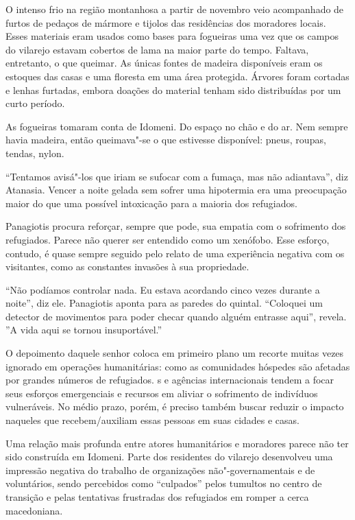 O intenso frio na região montanhosa a partir de novembro veio
acompanhado de furtos de pedaços de mármore e tijolos das residências
dos moradores locais. Esses materiais eram usados como bases para
fogueiras uma vez que os campos do vilarejo estavam cobertos de lama na
maior parte do tempo. Faltava, entretanto, o que queimar. As únicas
fontes de madeira disponíveis eram os estoques das casas e uma floresta
em uma área protegida. Árvores foram cortadas e lenhas furtadas, embora
doações do material tenham sido distribuídas por um curto período.

As fogueiras tomaram conta de Idomeni. Do espaço no chão e do ar. Nem
sempre havia madeira, então queimava"-se o que estivesse disponível:
pneus, roupas, tendas, nylon.

``Tentamos avisá"-los que iriam se sufocar com a fumaça, mas não
adiantava'', diz Atanasia. Vencer a noite gelada sem sofrer uma
hipotermia era uma preocupação maior do que uma possível intoxicação
para a maioria dos refugiados.

Panagiotis procura reforçar, sempre que pode, sua empatia com o
sofrimento dos refugiados. Parece não querer ser entendido como um
xenófobo. Esse esforço, contudo, é quase sempre seguido pelo relato de
uma experiência negativa com os visitantes, como as constantes invasões
à sua propriedade.

``Não podíamos controlar nada. Eu estava acordando cinco vezes durante a
noite'', diz ele. Panagiotis aponta para as paredes do quintal.
``Coloquei um detector de movimentos para poder checar quando alguém
entrasse aqui'', revela. ''A vida aqui se tornou insuportável.''

O depoimento daquele senhor coloca em primeiro plano um recorte muitas
vezes ignorado em operações humanitárias: como as comunidades hóspedes
são afetadas por grandes números de refugiados. s e agências
internacionais tendem a focar seus esforços emergenciais e recursos em
aliviar o sofrimento de indivíduos vulneráveis. No médio prazo, porém, é
preciso também buscar reduzir o impacto naqueles que recebem/auxiliam
essas pessoas em suas cidades e casas.

Uma relação mais profunda entre atores humanitários e moradores parece
não ter sido construída em Idomeni. Parte dos residentes do vilarejo
desenvolveu uma impressão negativa do trabalho de organizações
não"-governamentais e de voluntários, sendo percebidos como ``culpados''
pelos tumultos no centro de transição e pelas tentativas frustradas dos
refugiados em romper a cerca macedoniana.

